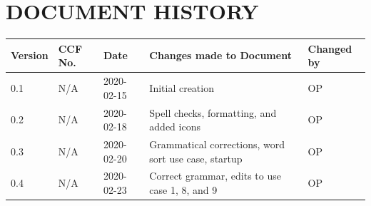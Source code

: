 \documentclass{project}
\begin{document}
\section*{DOCUMENT HISTORY}
\begin{tabular}{|l | l | l | l | l |}
\hline
Version & CCF No. & Date & Changes made to Document & Changed by \\
\hline
0.1 & N/A & 2020-02-15 & Initial creation & OP \\
\hline
0.2 & N/A & 2020-02-18 & Spell checks, formatting, and added icons & OP \\
\hline
0.3 & N/A & 2020-02-20 & Grammatical corrections, word sort use case, startup & OP \\
\hline
0.4 & N/A & 2020-02-23 & Correct grammar, edits to use case 1, 8, and 9 & OP \\
\hline
\end{tabular}
\label{thelastpage}
\end{document}
